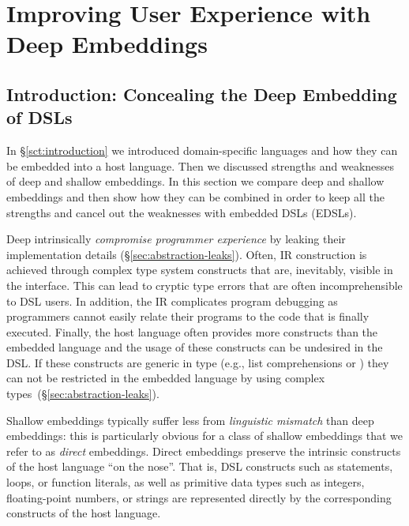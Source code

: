 \part{Improving User Experience with Deep Embeddings}

\chapter{Introduction: Concealing the Deep Embedding of DSLs}
\label{sec:introduction-yy}
In \S \ref{sct:introduction} we introduced domain-specific languages and how they can
 be embedded into a host language. Then we discussed strengths and weaknesses of deep and shallow embeddings.
 In this section we compare deep and shallow embeddings and then show how they can
 be combined in order to keep all the strengths and cancel out the weaknesses with
 embedded DSLs (EDSLs).



Deep \edsls{} intrinsically \emph{compromise programmer experience} by leaking their
implementation details (\S \ref{sec:abstraction-leaks}). Often, IR construction
is achieved through complex type system constructs that are, inevitably,
visible in the \edsl interface. This can lead to cryptic type errors
that are often incomprehensible to DSL users.
In addition, the IR complicates program debugging as programmers cannot easily
relate their programs to the code that is finally executed. Finally, the host
language often provides more constructs than the embedded language and the usage
of these constructs can be undesired in the DSL. If these constructs are generic in type
(e.g., list comprehensions or ) they can not be restricted in the embedded
language by using complex types~(\S \ref{sec:abstraction-leaks}).


Shallow embeddings typically suffer less from \emph{linguistic mismatch} than deep embeddings:
 this is particularly obvious for a class of shallow embeddings that we refer to
 as \emph{direct} embeddings. Direct embeddings preserve the intrinsic constructs
 of the host language ``on the nose''. That is, DSL
 constructs such as  statements, loops, or function literals, as well
 as primitive data types such as integers, floating-point numbers, or strings
 are represented directly by the corresponding constructs of the host language.

